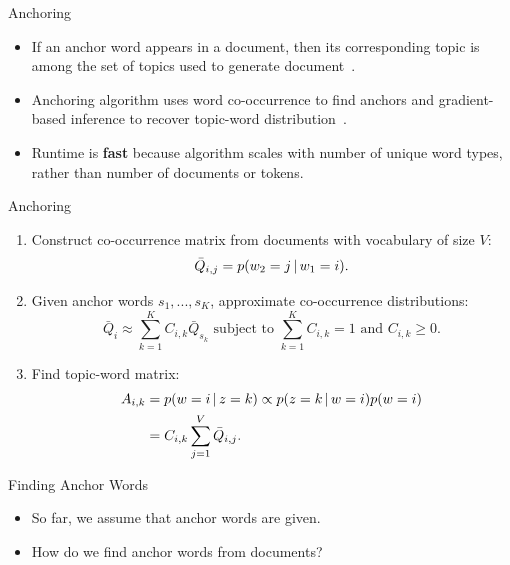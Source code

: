 \begin{frame}{Anchoring}
\begin{itemize}
\item If an anchor word appears in a document, then its corresponding topic is among the set of topics used to generate document~\cite{arora-2012-anchor}.
\item Anchoring algorithm uses word co-occurrence to find anchors and gradient-based inference to recover topic-word distribution~\cite{arora-2013}.
\item Runtime is \textbf{fast} because algorithm scales with number of unique word types, rather than number of documents or tokens.
\end{itemize}
\end{frame}

\begin{frame}{Anchoring}
\begin{enumerate}
\item<1-> Construct co-occurrence matrix from documents with vocabulary of size $V$: 
\[
\bar{Q}_{i,j} = p(w_2 = j \, | \, w_1 = i).
\]
\item<2-> Given anchor words $s_1,...,s_K$, approximate co-occurrence distributions:
\[
\bar{Q}_i \approx \sum\limits_{k=1}^K C_{i,k} \bar{Q}_{s_k} \text{ subject to } \sum\limits_{k=1}^K C_{i,k}=1 \text{ and } C_{i,k} \ge 0.
\]
\item<3-> Find topic-word matrix:
\begin{align*}
A_{i,k} &= p(w=i \, | \, z=k) \propto p(z=k \, | \, w=i) p(w=i)\\
 &= C_{i,k} \sum\limits_{j=1}^V \bar{Q}_{i,j}.
\end{align*}
\end{enumerate}
\end{frame}

\begin{frame}{Finding Anchor Words}
\begin{itemize} 
\item So far, we assume that anchor words are given. 
\item How do we find anchor words from documents?
\end{itemize}
\end{frame}

